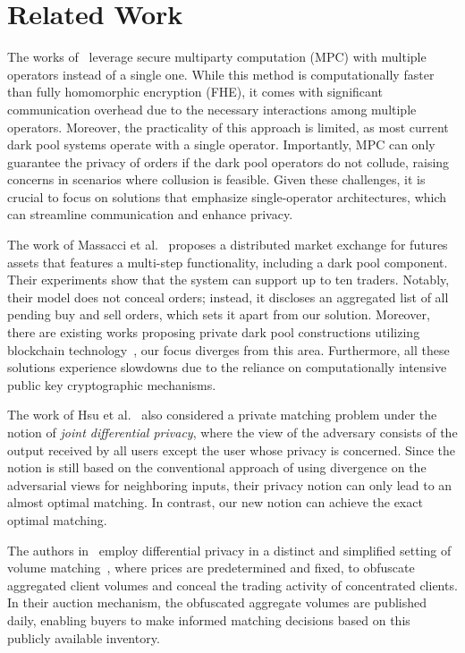 \section{Related Work}
The works of~\cite{CartlidgeSA19,CartlidgeSA21,MazloomDPB23} leverage secure multiparty computation (MPC) with multiple operators instead of a single one. While this method is computationally faster than fully homomorphic encryption (FHE), it comes with significant communication overhead due to the necessary interactions among multiple operators. Moreover, the practicality of this approach is limited, as most current dark pool systems operate with a single operator. Importantly, MPC can only guarantee the privacy of orders if the dark pool operators do not collude, raising concerns in scenarios where collusion is feasible. Given these challenges, it is crucial to focus on solutions that emphasize single-operator architectures, which can streamline communication and enhance privacy.

The work of Massacci et al.~\cite{massacci2018futuresmex} proposes a distributed market exchange for futures assets that features a multi-step functionality, including a dark pool component. Their experiments show that the system can support up to ten traders. Notably, their model does not conceal orders; instead, it discloses an aggregated list of all pending buy and sell orders, which sets it apart from our solution. Moreover, there are existing works proposing private dark pool constructions utilizing blockchain technology~\cite{bag2019seal,galal2021publicly,ngo2021practical}, our focus diverges from this area. Furthermore, all these solutions experience slowdowns due to the reliance on computationally intensive public key cryptographic mechanisms.


The work of Hsu et al.~\cite{DBLP:journals/siamcomp/HsuHRRW16} also considered a private matching problem under the notion of \emph{joint differential privacy}, where the view of the adversary consists of the output received by all users except the user whose privacy is concerned.
Since the notion is still based on the conventional approach of using divergence on the adversarial views for neighboring inputs, their privacy notion can only lead to an almost optimal matching. In contrast, our new notion can achieve the exact optimal matching.


The authors in~\cite{PolychroniadouC24} employ differential privacy in a distinct and simplified setting of volume matching~\cite{BalchDP20,GamaCPSA22,polychroniadou2023prime}, where prices are predetermined and fixed, to obfuscate aggregated client volumes and conceal the trading activity of concentrated clients. In their auction mechanism, the obfuscated aggregate volumes are published daily, enabling buyers to make informed matching decisions based on this publicly available inventory.